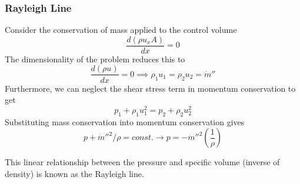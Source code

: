 \documentclass[11pt]{article}
\newcommand{\CenteredBoxed}[1]{\begin{center}\boxed{#1}\end{center}}
\begin{document}
\subsubsection{Rayleigh Line}
Consider the conservation of mass applied to the control volume
$$\frac{d(\rho u_xA)}{dx} = 0$$
The dimensionality of the problem reduces this to
$$\frac{d(\rho u)}{dx} = 0\implies\rho_1u_1=\rho_2u_2=\dot m''$$
Furthermore, we can neglect the shear stress term in momentum conservation to get
$$p_1+\rho_1u_1^2 = p_2+\rho_2u_2^2$$
Substituting mass conservation into momentum conservation gives
$$p + \dot m''^2/\rho = const.\to p = -\dot m''^2\left(\frac{1}{\rho}\right)$$
\CenteredBoxed{\frac{dp}{d(1/\rho)} = -\dot m''^2}
This linear relationship between the pressure and specific volume (inverse of density) is known as the Rayleigh line.
\end{document}
